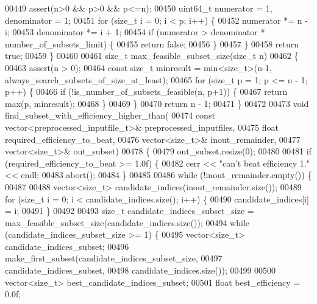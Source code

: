\begin{DoxyCode}
{{00449   assert(n>0 && p>0 && p<=n);
00450   uint64\_t numerator = 1, denominator = 1;
00451   \textcolor{keywordflow}{for} (\textcolor{keywordtype}{size\_t} i = 0; i < p; i++) \{
00452     numerator *= n - i;
00453     denominator *= i + 1;
00454     \textcolor{keywordflow}{if} (numerator > denominator * number\_of\_subsets\_limit) \{
00455       \textcolor{keywordflow}{return} \textcolor{keyword}{false};
00456     \}
00457   \}
00458   \textcolor{keywordflow}{return} \textcolor{keyword}{true};
00459 \}
00460 
00461 \textcolor{keywordtype}{size\_t} max\_feasible\_subset\_size(\textcolor{keywordtype}{size\_t} n)
00462 \{
00463   assert(n > 0);
00464   \textcolor{keyword}{const} \textcolor{keywordtype}{size\_t} minresult = min<size\_t>(n-1, always\_search\_subsets\_of\_size\_at\_least);
00465   \textcolor{keywordflow}{for} (\textcolor{keywordtype}{size\_t} p = 1; p <= n - 1; p++) \{
00466     \textcolor{keywordflow}{if} (!is\_number\_of\_subsets\_feasible(n, p+1)) \{
00467       \textcolor{keywordflow}{return} max(p, minresult);
00468     \}
00469   \}
00470   \textcolor{keywordflow}{return} n - 1;
00471 \}
00472 
00473 \textcolor{keywordtype}{void} find\_subset\_with\_efficiency\_higher\_than(
00474        \textcolor{keyword}{const} vector<preprocessed\_inputfile\_t>& preprocessed\_inputfiles,
00475        \textcolor{keywordtype}{float} required\_efficiency\_to\_beat,
00476        vector<size\_t>& inout\_remainder,
00477        vector<size\_t>& out\_subset)
00478 \{
00479   out\_subset.resize(0);
00480 
00481   \textcolor{keywordflow}{if} (required\_efficiency\_to\_beat >= 1.0f) \{
00482     cerr << \textcolor{stringliteral}{"can't beat efficiency 1."} << endl;
00483     abort();
00484   \}
00485 
00486   \textcolor{keywordflow}{while} (!inout\_remainder.empty()) \{
00487 
00488     vector<size\_t> candidate\_indices(inout\_remainder.size());
00489     \textcolor{keywordflow}{for} (\textcolor{keywordtype}{size\_t} i = 0; i < candidate\_indices.size(); i++) \{
00490       candidate\_indices[i] = i;
00491     \}
00492 
00493     \textcolor{keywordtype}{size\_t} candidate\_indices\_subset\_size = max\_feasible\_subset\_size(candidate\_indices.size());
00494     \textcolor{keywordflow}{while} (candidate\_indices\_subset\_size >= 1) \{
00495       vector<size\_t> candidate\_indices\_subset;
00496       make\_first\_subset(candidate\_indices\_subset\_size,
00497                         candidate\_indices\_subset,
00498                         candidate\_indices.size());
00499 
00500       vector<size\_t> best\_candidate\_indices\_subset;
00501       \textcolor{keywordtype}{float} best\_efficiency = 0.0f;
}}
\end{DoxyCode}

